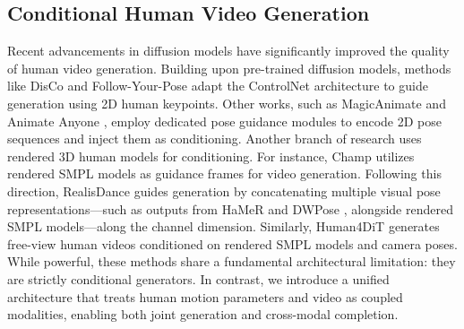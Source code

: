 \subsection{Conditional Human Video Generation}
Recent advancements in diffusion models have significantly improved the quality of human video generation. Building upon pre-trained diffusion models, methods like DisCo \citep{wang2024disco} and Follow-Your-Pose \citep{ma2024follow} adapt the ControlNet architecture to guide generation using 2D human keypoints. Other works, such as MagicAnimate \citep{xu2024magicanimate} and Animate Anyone \citep{hu2024animate}, employ dedicated pose guidance modules to encode 2D pose sequences and inject them as conditioning.
Another branch of research uses rendered 3D human models for conditioning. For instance, Champ \citep{zhu2024champ} utilizes rendered SMPL \citep{loper2023smpl} models as guidance frames for video generation. 
Following this direction, RealisDance \citep{zhou2024realisdance, zhou2025realisdance} guides generation by concatenating multiple visual pose representations—such as outputs from HaMeR \citep{pavlakos2024reconstructing} and DWPose \citep{yang2023effective}, alongside rendered SMPL models—along the channel dimension.
Similarly, Human4DiT \citep{shao2024human4dit} generates free-view human videos conditioned on rendered SMPL models and camera poses.
While powerful, these methods share a fundamental architectural limitation: they are strictly conditional generators. In contrast, we introduce a unified architecture that treats human motion parameters and video as coupled modalities, enabling both joint generation and cross-modal completion.